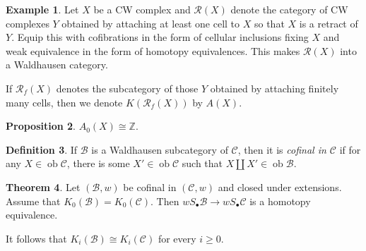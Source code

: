 \documentclass[10pt,letterpaper,cm]{nupset}
\theoremstyle{definition}
\newtheorem{definition}{Definition}
\newtheorem{exmp}[definition]{Example}
\theoremstyle{theorem}
\newtheorem{theorem}[definition]{Theorem}
\newtheorem{prop}[definition]{Proposition}
\theoremstyle{remark}
\newcommand{\Z}{\mathbb Z}
\newcommand{\1}{\mathbf{1}}
\renewcommand{\b}{\mathscr{B}}
\renewcommand{\c}{\mathscr{C}}
\newcommand{\0}{\vec 0}
\DeclareMathOperator{\ob}{ob}
\begin{document}
\begin{exmp}
Let $X$ be a CW complex and $\mathcal{R}(X)$ denote the category of CW complexes $Y$  obtained  by attaching at least one cell to $X$ so that $X$ is a retract of $Y$. Equip this with cofibrations in the form of cellular inclusions fixing $X$ and weak equivalence in the form of homotopy equivalences. This makes $\mathcal{R}(X)$ into a Waldhausen category. 

\smallskip
If $\mathcal{R}_f(X)$ denotes the subcategory of those $Y$ obtained by attaching finitely many cells, then we denote  $K(\mathcal{R}_f(X))$ by $A(X)$.
\end{exmp}

\begin{prop}
$A_0(X)\cong \Z$.
\end{prop}

\begin{definition}
If $\b$ is a Waldhausen subcategory of $\c$, then it is \textit{cofinal in $\c$} if for any $X \in \ob \c$, there is some $X' \in \ob \c$ such that $X \coprod X' \in \ob \b$.
\end{definition}

\begin{theorem}
Let $\left(\b, w\right)$ be cofinal in $\left(\c, w\right)$ and closed under extensions. Assume that $K_0(\b) = K_0(\c)$. Then $wS_{\bullet}\b \to wS_{\bullet}\c$ is a homotopy equivalence.
\end{theorem}

\smallskip

It follows that $K_i(\b) \cong K_i(\c)$ for every $i\geq 0$.
\end{document}

